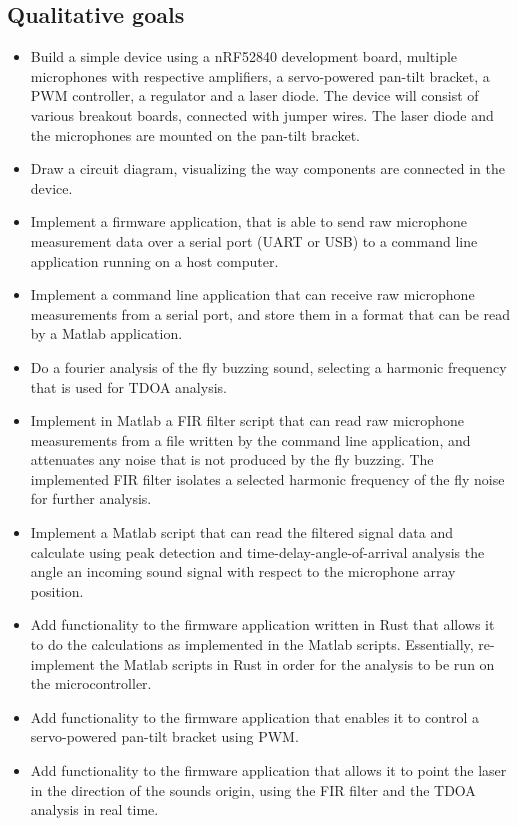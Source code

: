 \documentclass[a4paper]{article}
\begin{document}
\subsection{Qualitative goals}
\begin{itemize}
    \item Build a simple device using a nRF52840 development board, multiple microphones with respective amplifiers, a servo-powered pan-tilt bracket, a PWM controller, a regulator and a laser diode. The device will consist of various breakout boards, connected with jumper wires. The laser diode and the microphones are mounted on the pan-tilt bracket.
    \item Draw a circuit diagram, visualizing the way components are connected in the device.
    \item Implement a firmware application, that is able to send raw microphone measurement data over a serial port (UART \cite{uart} or USB) to a command line application running on a host computer.
    \item Implement a command line application that can receive raw microphone measurements from a serial port, and store them in a format that can be read by a Matlab application.
    \item Do a fourier analysis of the fly buzzing sound, selecting a harmonic frequency that is used for TDOA analysis.
    \item Implement in Matlab a FIR filter script that can read raw microphone measurements from a file written by the command line application, and attenuates any noise that is not produced by the fly buzzing. The implemented FIR filter isolates a selected harmonic frequency of the fly noise for further analysis.
    \item Implement a Matlab script that can read the filtered signal data and calculate using peak detection and time-delay-angle-of-arrival analysis the angle an incoming sound signal with respect to the microphone array position.
    \item Add functionality to the firmware application written in Rust that allows it to do the calculations as implemented in the Matlab scripts. Essentially, re-implement the Matlab scripts in Rust in order for the analysis to be run on the microcontroller.
    \item Add functionality to the firmware application that enables it to control a servo-powered pan-tilt bracket using PWM.
    \item Add functionality to the firmware application that allows it to point the laser in the direction of the sounds origin, using the FIR filter and the TDOA analysis in real time.
\end{itemize} 
\end{document}
